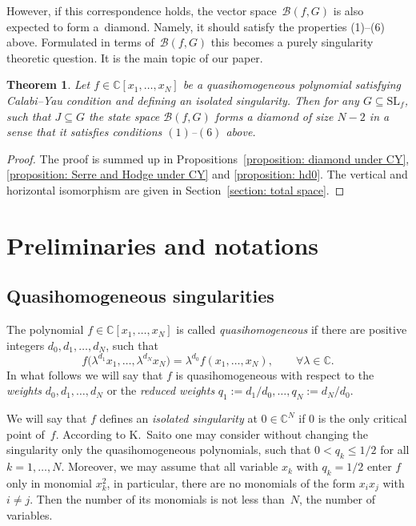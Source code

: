 \documentclass[10pt,a4paper]{amsart}
\numberwithin{equation}{section}
\newtheorem{Theorem}{Theorem}[section]
\newcommand{\CC}{{\mathbb{C}}}
\newcommand{\SL}{{\mathrm{SL}}}
\def\B{{\mathcal B}}
\begin{document}
However, if this correspondence holds, the vector space~$\B(f,G)$ is also expected to form a~diamond. Namely, it should satisfy the properties (1)--(6) above. Formulated in terms of~$\B(f,G)$ this becomes a purely singularity theoretic question.
It is the main topic of our paper.


\begin{Theorem}\label{theorem: main}
	Let $f \in \CC[x_1,\dots,x_N]$ be a quasihomogeneous polynomial satisfying Calabi--Yau condition and defining an isolated singularity.
	Then for any $G \subseteq \SL_f$, such that $J \subseteq G$ the state space $\B(f,G)$ forms a diamond of size $N-2$ in a sense that it satisfies conditions $(1)$--$(6)$ above.
\end{Theorem}

\begin{proof}
	The proof is summed up in Propositions~\ref{proposition: diamond under CY}, \ref{proposition: Serre and Hodge under CY} and \ref{proposition: hd0}.
	The vertical and horizontal isomorphism are given in Section~\ref{section: total space}.
\end{proof}


\section{Preliminaries and notations}

\subsection{Quasihomogeneous singularities}

The polynomial $f \in \CC[x_1,\dots,x_N]$ is called \textit{quasihomogeneous} if there are positive integers $d_0,d_1,\dots,d_N$, such that
\begin{equation}\label{QH1}
	f\bigl(\lambda^{d_1}x_1,\dots,\lambda^{d_N}x_N\bigr) = \lambda^{d_0} f(x_1,\dots,x_N), \qquad \forall \lambda \in \CC.
\end{equation}
In what follows we will say that $f$ is quasihomogeneous with respect to the \textit{weights} $d_0,d_1,\dots,d_N$ or the \textit{reduced weights} $q_1 := d_1/d_0,\dots,q_N:= d_N/d_0$.

We will say that $f$ defines an \textit{isolated singularity} at $0 \in \CC^N$ if $0$ is the only critical point of~$f$.
According to K.~Saito \cite[Satz~1.3]{S71} one may consider without changing the singularity only the quasihomogeneous polynomials, such that $0 < q_k \le 1/2$ for all $k=1,\dots,N$. Moreover, we may assume that all variable $x_k$ with $q_k=1/2$ enter $f$ only in monomial $x_k^2$, in particular, there are no monomials of the form $x_ix_j$ with $i\ne j$. Then the number of its monomials is not less than~$N$, the number of variables.
\end{document}
